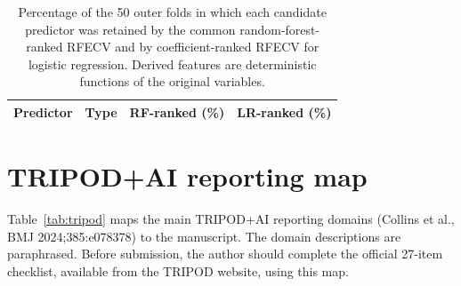 \documentclass[11pt]{article}
\begin{document}
\begin{table}[H]
\centering
\caption{Percentage of the 50 outer folds in which each candidate predictor was retained by the common random-forest-ranked RFECV and by coefficient-ranked RFECV for logistic regression. Derived features are deterministic functions of the original variables.}
\label{tab:s-selection}
\small
\begin{tabular}{llrr}
\toprule
Predictor & Type & RF-ranked (\%) & LR-ranked (\%) \\
\midrule

\end{tabular}
\end{table}

\section{TRIPOD+AI reporting map}

Table~\ref{tab:tripod} maps the main TRIPOD+AI reporting domains (Collins et al., BMJ 2024;385:e078378) to the manuscript. The domain descriptions are paraphrased. Before submission, the author should complete the official 27-item checklist, available from the TRIPOD website, using this map.
\end{document}
